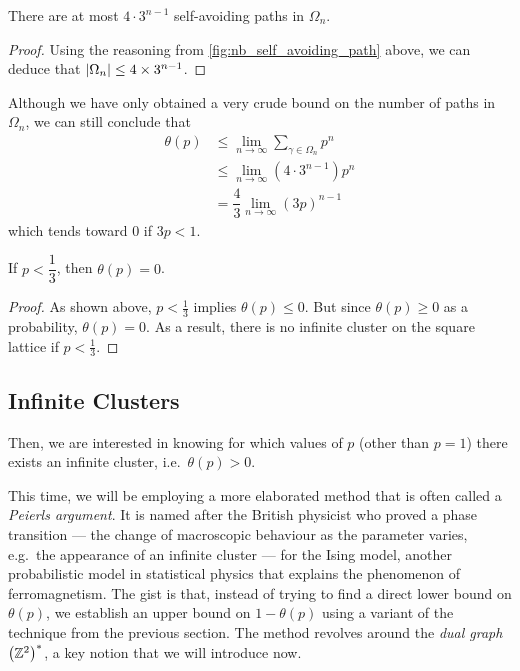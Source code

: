 \documentclass[a4paper, 12pt]{article}
\begin{document}
\begin{prop}
There are at most $4 \cdot 3^{n - 1}$ self-avoiding paths in $\Omega_n$.
\end{prop}
\begin{proof}

Using the reasoning from \cref{fig:nb_self_avoiding_path} above, we can deduce that $\lvert \Omega_n \rvert \leq 4 \times 3^{n - 1}$.
\end{proof}

Although we have only obtained a very crude bound on the number of paths in $\Omega_n$, we can still conclude that
\begin{align*}
    \theta(p)
    &\leq \lim_{n \to \infty} \sum_{\gamma \in \Omega_n} p^n\\
    &\leq \lim_{n \to \infty} (4 \cdot 3^{n - 1}) p^n\\
    &= \dfrac{4}{3} \lim_{n \to \infty} (3p)^{n - 1}
\end{align*}
which tends toward 0 if $3p < 1$.

\begin{thm}
If $p < \dfrac{1}{3}$, then $\theta(p) = 0$.
\end{thm}
\begin{proof}
As shown above, $p < \frac{1}{3}$ implies $\theta(p) \leq 0$. But since $\theta(p) \geq 0$ as a probability, $\theta(p) = 0$. As a result, there is no infinite cluster on the square lattice if $p < \frac{1}{3}$.
\end{proof}

\subsection{Infinite Clusters}
Then, we are interested in knowing for which values of $p$ (other than $p = 1$) there exists an infinite cluster, i.e.\ $\theta(p) > 0$.

This time, we will be employing a more elaborated method that is often called a \textit{Peierls argument}. It is named after the British physicist \autocite[477]{peierls_1936} who proved a phase transition --- the change of macroscopic behaviour as the parameter varies, e.g.\ the appearance of an infinite cluster --- for the Ising model, another probabilistic model in statistical physics that explains the phenomenon of ferromagnetism. The gist is that, instead of trying to find a direct lower bound on $\theta(p)$, we establish an upper bound on $1 - \theta(p)$ using a variant of the technique from the previous section. The method revolves around the \textit{dual graph} $\left(\mathbb{Z}^2\right)^*$, a key notion that we will introduce now.
\end{document}
